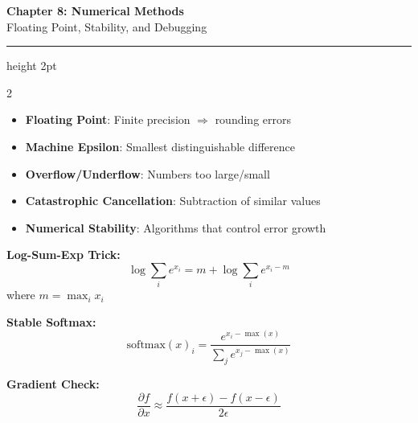 \documentclass[11pt,letterpaper]{article}
\begin{document}
\begin{center}
{\LARGE\bfseries\color{primaryblue} Chapter 8: Numerical Methods}\\[3pt]
{\large Floating Point, Stability, and Debugging}
\end{center}
\vspace{-5pt}
\hrule height 2pt
\vspace{8pt}

\begin{multicols}{2}

\begin{tcolorbox}[conceptbox, title={\faLightbulb\ Key Concepts}]
\begin{itemize}
    \item \textbf{Floating Point}: Finite precision $\Rightarrow$ rounding errors
    \item \textbf{Machine Epsilon}: Smallest distinguishable difference
    \item \textbf{Overflow/Underflow}: Numbers too large/small
    \item \textbf{Catastrophic Cancellation}: Subtraction of similar values
    \item \textbf{Numerical Stability}: Algorithms that control error growth
\end{itemize}
\end{tcolorbox}

\begin{tcolorbox}[formulabox, title={\faCalculator\ Core Formulas}]
\textbf{Log-Sum-Exp Trick:}
\[ \log \sum_i e^{x_i} = m + \log \sum_i e^{x_i - m} \]
where $m = \max_i x_i$

\textbf{Stable Softmax:}
\[ \text{softmax}(x)_i = \frac{e^{x_i - \max(x)}}{\sum_j e^{x_j - \max(x)}} \]

\textbf{Gradient Check:}
\[ \frac{\partial f}{\partial x} \approx \frac{f(x+\epsilon) - f(x-\epsilon)}{2\epsilon} \]
\end{tcolorbox}

\columnbreak

\begin{center}
\end{center}
\end{multicols}
\end{document}
